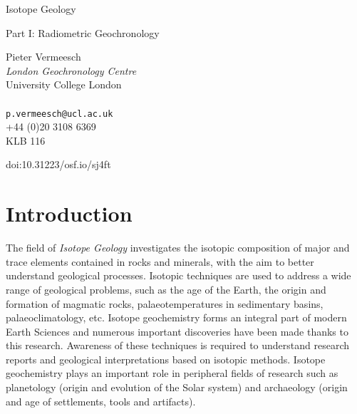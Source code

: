 \documentclass{book}
\begin{document}
\begin{titlepage}
  \centering
  \vfill
  \begin{Huge}
    Isotope Geology\\
  \end{Huge}
  \vspace{1cm}
  \begin{huge}
  Part I: Radiometric Geochronology\\
  \end{huge}
  \vspace{2cm}
  \begin{large}
  Pieter Vermeesch\\
  \textit{London Geochronology Centre}\\
  University College London \\~\\
  \texttt{p.vermeesch@ucl.ac.uk} \\
  +44 (0)20 3108 6369\\
  KLB 116
  \end{large}
  \vfill
  doi:10.31223/osf.io/sj4ft
\end{titlepage}

\tableofcontents

\chapter{Introduction}
\label{sec:intro}

The field of \emph{Isotope Geology} investigates the isotopic
composition of major and trace elements contained in rocks and
minerals, with the aim to better understand geological processes.
Isotopic techniques are used to address a wide range of geological
problems, such as the age of the Earth, the origin and formation of
magmatic rocks, palaeotemperatures in sedimentary basins,
palaeoclimatology, etc.  Isotope geochemistry forms an integral part of
modern Earth Sciences and numerous important discoveries have been
made thanks to this research.  Awareness of these techniques is
required to understand research reports and geological interpretations
based on isotopic methods. Isotope geochemistry plays an important
role in peripheral fields of research such as planetology (origin and
evolution of the Solar system) and archaeology (origin and age of
settlements, tools and artifacts).\\
\end{document}
